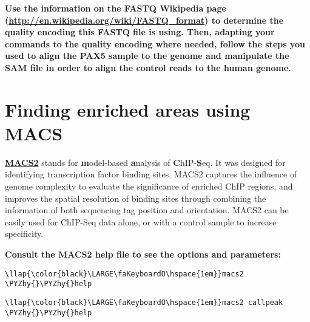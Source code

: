 \documentclass[11pt]{article}
\def\PYZhy{\char`\-}
\begin{document}
    \textbf{Use the information on the FASTQ Wikipedia page
(\url{http://en.wikipedia.org/wiki/FASTQ_format}) to determine the
quality encoding this FASTQ file is using. Then, adapting your commands
to the quality encoding where needed, follow the steps you used to align
the PAX5 sample to the genome and manipulate the SAM file in order to
align the control reads to the human genome.}




\newpage





    \hypertarget{finding-enriched-areas-using-macs}{%
\section{Finding enriched areas using
MACS}\label{finding-enriched-areas-using-macs}}

\href{https://github.com/taoliu/MACS}{\textbf{MACS2}} stands for
\textbf{m}odel-based \textbf{a}nalysis of \textbf{C}hIP-\textbf{S}eq. It
was designed for identifying transcription factor binding sites. MACS2
captures the influence of genome complexity to evaluate the significance
of enriched ChIP regions, and improves the spatial resolution of binding
sites through combining the information of both sequencing tag position
and orientation. MACS2 can be easily used for ChIP-Seq data alone, or
with a control sample to increase specificity.

    \textbf{Consult the MACS2 help file to see the options and parameters:}





\begin{terminalinput}
\begin{Verbatim}[commandchars=\\\{\}]
\llap{\color{black}\LARGE\faKeyboardO\hspace{1em}}macs2 \PYZhy{}\PYZhy{}help
\end{Verbatim}
\end{terminalinput}







\begin{terminalinput}
\begin{Verbatim}[commandchars=\\\{\}]
\llap{\color{black}\LARGE\faKeyboardO\hspace{1em}}macs2 callpeak \PYZhy{}\PYZhy{}help
\end{Verbatim}
\end{terminalinput}
\end{document}
